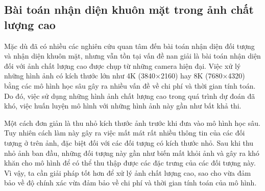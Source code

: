 {    \subsection{Bài toán nhận diện khuôn mặt trong ảnh chất lượng cao}
    Mặc dù đã có nhiều các nghiên cứu quan tâm đến bài toán nhận diện đối tượng và nhận diện khuôn mặt, nhưng vẫn tồn tại vấn đề nan giải là bài toán nhận diện đối với ảnh chất lượng cao được chụp từ những camera hiện đại.
    Việc xử lý những hình ảnh có kích thước lớn như 4K (3840×2160) hay 8K (7680×4320) bằng các mô hình học sâu gây ra nhiều vấn đề về chi phí và thời gian tính toán.
    Do đó, việc sử dụng những hình ảnh chất lượng cao trong quá trình dự đoán đã khó, việc huấn luyện mô hình với những hình ảnh này gần như bất khả thi.

    \noindent
    Một cách đơn giản là thu nhỏ kích thước ảnh trước khi đưa vào mô hình học sâu.
    Tuy nhiên cách làm này gây ra việc mất mát rất nhiều thông tin của các đối tượng ở trên ảnh, đặc biệt đối với các đối tượng có kích thước nhỏ.
    Sau khi thu nhỏ ảnh ban đầu, những đối tượng này gần như biến mất khỏi ảnh và gây ra khó khăn cho mô hình để có thể thu thập được các đặc trưng của các đối tượng này.
    Vì vậy, ta cần giải pháp tốt hơn để xử lý ảnh chất lượng cao, sao cho vừa đảm bảo về độ chính xác vừa đảm bảo về chi phí và thời gian tính toán của mô hình.
}